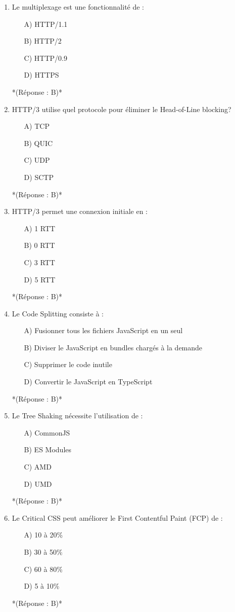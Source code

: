 \documentclass[12pt,a4paper,twoside]{report}
\begin{document}
\begin{enumerate}
\item Le multiplexage est une fonctionnalité de :
\begin{itemize}
\item[A)] HTTP/1.1
\item[B)] HTTP/2
\item[C)] HTTP/0.9
\item[D)] HTTPS
\end{itemize}
*(Réponse : B)*

\item HTTP/3 utilise quel protocole pour éliminer le Head-of-Line blocking?
\begin{itemize}
\item[A)] TCP
\item[B)] QUIC
\item[C)] UDP
\item[D)] SCTP
\end{itemize}
*(Réponse : B)*

\item HTTP/3 permet une connexion initiale en :
\begin{itemize}
\item[A)] 1 RTT
\item[B)] 0 RTT
\item[C)] 3 RTT
\item[D)] 5 RTT
\end{itemize}
*(Réponse : B)*

\item Le Code Splitting consiste à :
\begin{itemize}
\item[A)] Fusionner tous les fichiers JavaScript en un seul
\item[B)] Diviser le JavaScript en bundles chargés à la demande
\item[C)] Supprimer le code inutile
\item[D)] Convertir le JavaScript en TypeScript
\end{itemize}
*(Réponse : B)*

\item Le Tree Shaking nécessite l'utilisation de :
\begin{itemize}
\item[A)] CommonJS
\item[B)] ES Modules
\item[C)] AMD
\item[D)] UMD
\end{itemize}
*(Réponse : B)*

\item Le Critical CSS peut améliorer le First Contentful Paint (FCP) de :
\begin{itemize}
\item[A)] 10 à 20\%
\item[B)] 30 à 50\%
\item[C)] 60 à 80\%
\item[D)] 5 à 10\%
\end{itemize}
*(Réponse : B)*


\end{enumerate}
\end{document}
